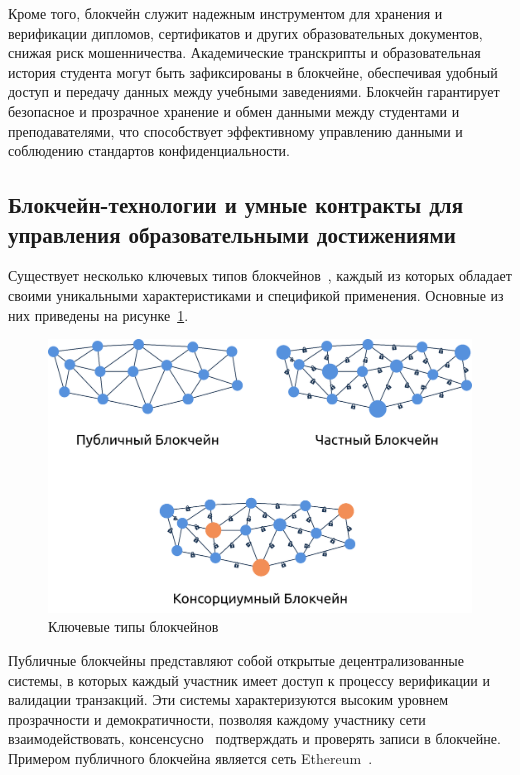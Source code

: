 Кроме того, блокчейн служит надежным инструментом для хранения и верификации дипломов, сертификатов и других образовательных документов, снижая риск мошенничества. Академические транскрипты и образовательная история студента могут быть зафиксированы в блокчейне, обеспечивая удобный доступ и передачу данных между учебными заведениями. Блокчейн гарантирует безопасное и прозрачное хранение и обмен данными между студентами и преподавателями, что способствует эффективному управлению данными и соблюдению стандартов конфиденциальности.

\subsection{Блокчейн-технологии и умные контракты для управления образовательными достижениями}

Существует несколько ключевых типов блокчейнов~\cite{bib:types_of_blockchains}, каждый из которых обладает своими уникальными характеристиками и спецификой применения. Основные из них приведены на рисунке~\ref{fig:types_of_blockchains}.

\begin{figure}[H]   
	\centering
	\includegraphics[width=\textwidth]{images/1.types_of_blockchains.png}
	\parskip=6pt
	\caption{Ключевые типы блокчейнов}
	\label{fig:types_of_blockchains}
\end{figure}
Публичные блокчейны представляют собой открытые децентрализованные системы, в которых каждый участник имеет доступ к процессу верификации и валидации транзакций. Эти системы характеризуются высоким уровнем прозрачности и демократичности, позволяя каждому участнику сети взаимодействовать, консенсусно~\cite{bib:consensus} подтверждать и проверять записи в блокчейне. Примером публичного блокчейна является сеть Ethereum~\cite{bib:ethereum}.

